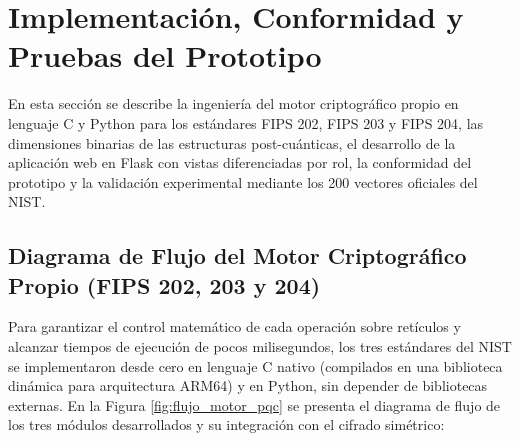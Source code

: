 \section{Implementación, Conformidad y Pruebas del Prototipo}
\label{sec:implementacion_software_pqc}

En esta sección se describe la ingeniería del motor criptográfico propio en lenguaje C y Python para los estándares FIPS 202, FIPS 203 y FIPS 204, las dimensiones binarias de las estructuras post-cuánticas, el desarrollo de la aplicación web en Flask con vistas diferenciadas por rol, la conformidad del prototipo y la validación experimental mediante los 200 vectores oficiales del NIST.

\subsection{Diagrama de Flujo del Motor Criptográfico Propio (FIPS 202, 203 y 204)}

Para garantizar el control matemático de cada operación sobre retículos y alcanzar tiempos de ejecución de pocos milisegundos, los tres estándares del NIST se implementaron desde cero en lenguaje C nativo (compilados en una biblioteca dinámica para arquitectura ARM64) y en Python, sin depender de bibliotecas externas. En la Figura \ref{fig:flujo_motor_pqc} se presenta el diagrama de flujo de los tres módulos desarrollados y su integración con el cifrado simétrico:

